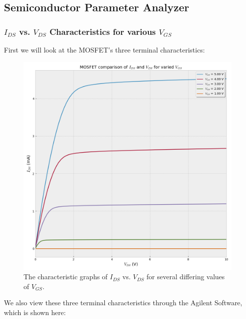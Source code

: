 \subsection{Semiconductor Parameter Analyzer}

\subsubsection{\texorpdfstring{$I_{DS}$ vs. $V_{DS}$ Characteristics for various $V_{GS}$}{Dump to Source Current vs Voltage Characteristics for various Gate to Source Voltages}}

First we will look at the MOSFET's three terminal characteristics:

\begin{figure}[ht]
    \centering
    \includegraphics[width=.95\linewidth]{figures/characteristic_nothing.png}
    \caption{The characteristic graphs of $I_{DS}$ vs. $V_{DS}$ for several differing values of $V_{GS}$. }
    \label{fig:characteristic}
\end{figure}

\clearpage

We also view these three terminal characteristics through the Agilent Software, which is shown here:

